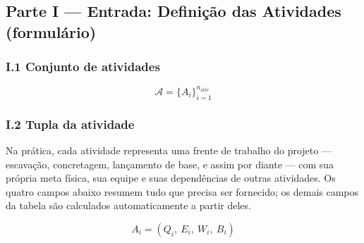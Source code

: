 \documentclass[
  10pt,
]{article}
\begin{document}
\hypertarget{parte-i-entrada-definiuxe7uxe3o-das-atividades-formuluxe1rio}{%
\subsection{Parte I --- Entrada: Definição das Atividades
(formulário)}\label{parte-i-entrada-definiuxe7uxe3o-das-atividades-formuluxe1rio}}

\hypertarget{i.1-conjunto-de-atividades}{%
\subsubsection{I.1 Conjunto de
atividades}\label{i.1-conjunto-de-atividades}}

\[\mathcal{A} = \{A_i\}_{i=1}^{n_{\text{ativ}}}\]

\hypertarget{i.2-tupla-da-atividade}{%
\subsubsection{I.2 Tupla da atividade}\label{i.2-tupla-da-atividade}}

Na prática, cada atividade representa uma frente de trabalho do projeto
--- escavação, concretagem, lançamento de base, e assim por diante ---
com sua própria meta física, sua equipe e suas dependências de outras
atividades. Os quatro campos abaixo resumem tudo que precisa ser
fornecido; os demais campos da tabela são calculados automaticamente a
partir deles.

\[A_i = (Q_i,\ E_i,\ W_i,\ B_i)\]
\end{document}
